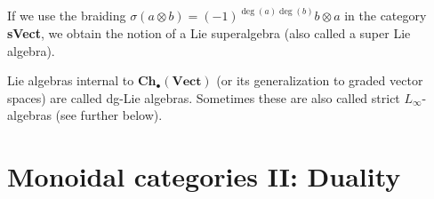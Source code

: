     \begin{example}\label{hda:lie_superalgebra}
        If we use the braiding $\sigma(a\otimes b) = (-1)^{\deg(a)\deg(b)}b\otimes a$ in the category \textbf{sVect}, we obtain the notion of a Lie superalgebra (also called a super Lie algebra).
    \end{example}
    \begin{example}
        Lie algebras internal to $\mathbf{Ch}_\bullet(\mathbf{Vect})$ (or its generalization to graded vector spaces) are called dg-Lie algebras. Sometimes these are also called strict $L_\infty$-algebras (see further below).
    \end{example}

\section{Monoidal categories II: Duality}\label{section:duality}


